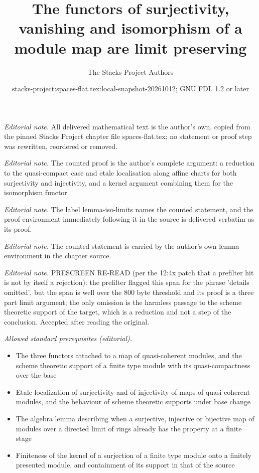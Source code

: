 \documentclass[10pt,a4paper]{amsart}
\title{The functors of surjectivity, vanishing and isomorphism of a module map are limit preserving}
\author{The Stacks Project Authors}
\date{stacks-project:spaces-flat.tex:local-snapshot-20261012; GNU FDL 1.2 or later}
\theoremstyle{plain}
\theoremstyle{definition}
\theoremstyle{remark}
\numberwithin{equation}{subsection}
\begin{document}
\maketitle
\noindent\textit{Editorial note.} All delivered mathematical text is the author's own, copied from the pinned Stacks Project chapter file spaces-flat.tex; no statement or proof step was rewritten, reordered or removed.\par\medskip
\noindent\textit{Editorial note.} The counted proof is the author's complete argument: a reduction to the quasi-compact case and etale localisation along affine charts for both surjectivity and injectivity, and a kernel argument combining them for the isomorphism functor\par\medskip
\noindent\textit{Editorial note.} The label lemma-iso-limits names the counted statement, and the proof environment immediately following it in the source is delivered verbatim as its proof.\par\medskip
\noindent\textit{Editorial note.} The counted statement is carried by the author's own lemma environment in the chapter source.\par\medskip
\noindent\textit{Editorial note.} PRESCREEN RE-READ (per the 12:4x patch that a prefilter hit is not by itself a rejection): the prefilter flagged this span for the phrase 'details omitted', but the span is well over the 800 byte threshold and its proof is a three part limit argument; the only omission is the harmless passage to the scheme theoretic support of the target, which is a reduction and not a step of the conclusion. Accepted after reading the original.\par\medskip
\noindent\textit{Allowed standard prerequisites (editorial).}\begin{itemize}
\item The three functors attached to a map of quasi-coherent modules, and the scheme theoretic support of a finite type module with its quasi-compactness over the base
\item Etale localization of surjectivity and of injectivity of maps of quasi-coherent modules, and the behaviour of scheme theoretic supports under base change
\item The algebra lemma describing when a surjective, injective or bijective map of modules over a directed limit of rings already has the property at a finite stage
\item Finiteness of the kernel of a surjection of a finite type module onto a finitely presented module, and containment of its support in that of the source
\end{itemize}\medskip
\end{document}
